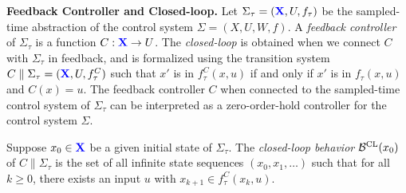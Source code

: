 \smallskip
\noindent\textbf{Feedback Controller and Closed-loop.}
Let $\Sigma_\tau=({\color{blue} \mathbf{X}},U,f_\tau)$ be the sampled-time abstraction of the control system $\Sigma=(X,U,W,f)$.
A \emph{feedback controller} of $\Sigma_\tau$ is a function $C:{\color{blue} \mathbf{X}}\rightarrow U$.
The \emph{closed-loop} is obtained when we connect $C$ with $\Sigma_\tau$ in feedback, and is formalized using the transition system $C\parallel\Sigma_\tau = ({\color{blue} \mathbf{X}},U,f_\tau^C)$ such that $x'$ is in $f_\tau^C(x,u)$ if and only if $x'$ is in $f_\tau(x,u)$ and $C(x)=u$.
The feedback controller $C$ when connected to the sampled-time control system of $\Sigma_\tau$ can be interpreted as a zero-order-hold controller for the control system $\Sigma$.

Suppose $x_0\in {\color{blue} \mathbf{X}}$ be a given initial state of $\Sigma_\tau$.
The \emph{closed-loop behavior} $\mathcal{B}^{\mathrm{CL}}(x_0)$ of $C\parallel\Sigma_\tau$ is the set of all infinite state sequences $(x_0,x_1,\ldots)$ such that for all $k\geq 0$, there exists an input $u$ with $x_{k+1}\in f_\tau^C(x_k,u)$.



